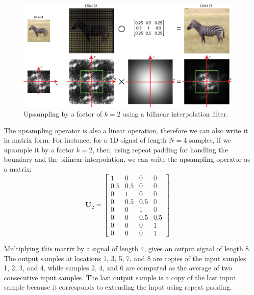 \begin{figure}[t]
	\includegraphics[width=1\linewidth]{figures/upsamplig_downsampling/upsampling_bilinear.eps}
	\caption{Upsampling by a factor of $k=2$ using a bilinear interpolation filter.}
	\label{fig:upsamplingazebra}
\end{figure}



The upsampling operator is also a linear operation, therefore we can also write it in matrix form. For instance, for a 1D signal of length $N=4$  samples, if we upsample it by a factor $k=2$, then, using repeat padding for handling the boundary and the bilinear interpolation, we can write the upsampling operator as a matrix:
\begin{equation}
	\mathbf{U}_2 = \left[
		\begin{array}{cccc}
			1   & 0   & 0   & 0   \\
			0.5 & 0.5 & 0   & 0   \\
			0   & 1   & 0   & 0   \\
			0   & 0.5 & 0.5 & 0   \\
			0   & 0   & 1   & 0   \\
			0   & 0   & 0.5 & 0.5 \\
			0   & 0   & 0   & 1   \\
			0   & 0   & 0   & 1
		\end{array}
		\right]
\end{equation}

Multiplying this matrix by a signal of length 4, gives an output signal of length 8. The output samples at locations 1, 3, 5, 7, and 8 are copies of the input samples 1, 2, 3, and 4, while samples 2, 4, and 6 are computed as the average of two consecutive input samples. The last output sample is a copy of the last input sample because it corresponds to extending the input using repeat padding.



